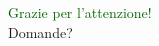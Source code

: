 \documentclass{beamer}
\begin{document}
\begin{frame}
    \centering
    \Huge \textcolor{darkgreen}{Grazie per l'attenzione!} \\
    \vspace{0.5cm}
    \large Domande?
\end{frame}
\end{document}
